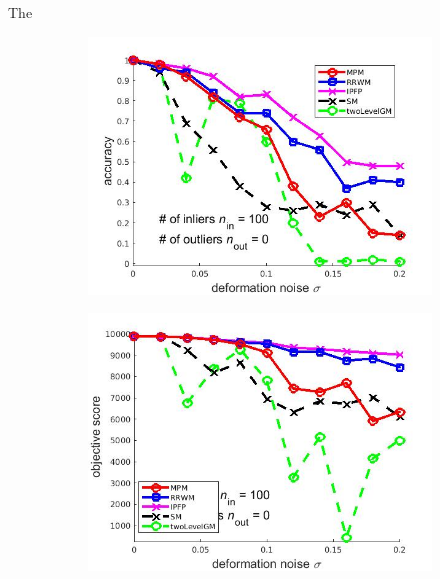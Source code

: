 \documentclass[
	fontsize=12pt,
	paper=a4,
	twoside=false,
	numbers=noenddot,
	plainheadsepline,
	toc=listof,
	toc=bibliography
]{scrartcl}
\begin{document}
The 

\begin{figure}[ht] 
	\begin{subfigure}[b]{0.3\textwidth}
		\centering
		\includegraphics[scale=0.25]{"fig_ver2108/syntheticPointSets/deformation_test/accuracy_greedy"} 
	\end{subfigure}%
	\begin{subfigure}[b]{0.3\textwidth}
		\centering
		\includegraphics[scale=0.25]{"fig_ver2108/syntheticPointSets/deformation_test/score_greedy"} 
	\end{subfigure} 
	\begin{subfigure}[b]{0.3\textwidth}
		\centering

\end{subfigure}
\end{figure}
\end{document}
